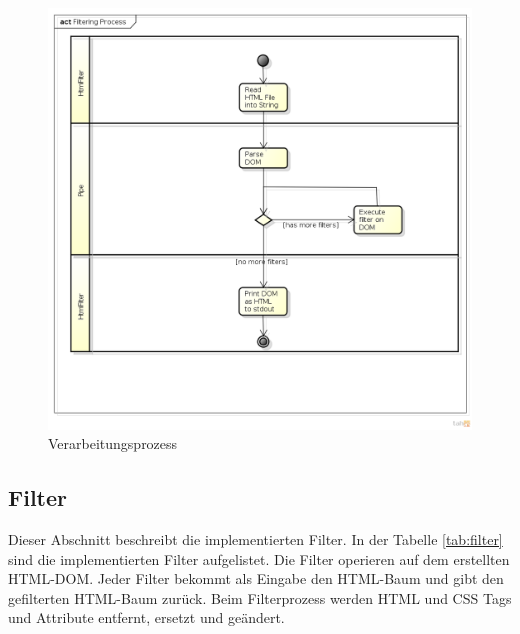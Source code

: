 \begin{figure}[H]
	\begin{center}
		\includegraphics[width=1.0\textwidth]{./content/Filtering_Process_cut.png}
	\end{center}
	\caption{Verarbeitungsprozess}
	\label{fig:process}
\end{figure}

\subsection{Filter}

Dieser Abschnitt beschreibt die implementierten Filter. 
In der Tabelle \ref{tab:filter} sind die implementierten Filter aufgelistet. Die Filter operieren auf dem erstellten HTML-DOM.
Jeder Filter bekommt als Eingabe den HTML-Baum und gibt den gefilterten HTML-Baum zurück. 
Beim Filterprozess werden HTML und CSS Tags und Attribute entfernt, ersetzt und geändert.

